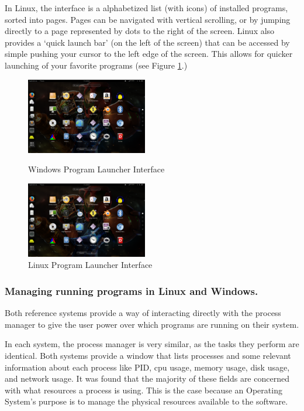 \documentclass[a4paper]{report}
\begin{document}
In Linux, the interface is a alphabetized list (with icons) of installed programs, sorted into pages. Pages can be navigated with vertical scrolling, or by jumping directly to a page represented by dots to the right of the screen. Linux also provides a `quick launch bar' (on the left of the screen) that can be accessed by simple pushing your cursor to the left edge of the screen. This allows for quicker launching of your favorite programs (see Figure \ref{fig:LinLaunchScreen}.)


\begin{figure}[ht]
\centering
\begin{minipage}{.5\textwidth}
  \centering
  \includegraphics[width=200px]{images/Linux_Program_Launcher_Screenshot}
  \caption{Windows Program Launcher Interface}
  \label{fig:WinLaunchScreen}
\end{minipage}%
\begin{minipage}{.5\textwidth}
  \centering
  \includegraphics[width=200px]{images/Linux_Program_Launcher_Screenshot}
  \caption{Linux Program Launcher Interface}
  \label{fig:LinLaunchScreen}
\end{minipage}
\end{figure}


\subsubsection*{Managing running programs in Linux and Windows.}

Both reference systems provide a way of interacting directly with the process manager to give the user power over which programs are running on their system.

In each system, the process manager is very similar, as the tasks they perform are identical. Both systems provide a window that lists processes and some relevant information about each process like PID, cpu usage, memory usage, disk usage, and network usage. It was found that the majority of these fields are concerned with what resources a process is using. This is the case because an Operating System's purpose is to manage the physical resources available to the software.
\end{document}
